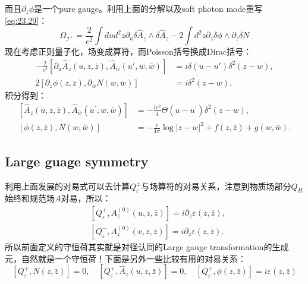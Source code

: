 而且$\partial_z \phi$是一个pure gauge。利用上面的分解以及soft photon mode重写\ref{eq:23.29}：
\begin{equation}
	\Omega_{\mathcal{I}^{+}}=\frac{2}{e^{2}}\int dud^{2}z\partial_{u}\delta\hat{A}_{z}\wedge\delta\hat{A}_{\bar{z}}-2\int d^{2}z\partial_{z}\delta\phi\wedge\partial_{\bar{z}}\delta N
\end{equation}
现在考虑正则量子化，场变成算符，而Poisson括号换成Dirac括号：
\begin{equation}
	\begin{aligned}-\frac{2}{e^2}\left[\partial_u\hat A_z(u,z,\bar z),\hat A_{\bar w}(u',w,\bar w)\right]&=i\delta(u-u')\delta^2(z-w),\\2\left[\partial_z\phi(z,\bar z),\partial_{\bar w}N(w,\bar w)\right]&=i\delta^2(z-w).\end{aligned}
\end{equation}
积分得到：
\begin{equation}
	\begin{aligned}
		\left[\hat{A}_{z}(u,z,\bar{z}),\hat{A}_{\bar{w}}(u^{\prime},w,\bar{w})\right]& =-\frac{ie^{2}}{4}\Theta(u-u^{\prime})\delta^{2}(z-w),  \\
		[\phi(z,\bar{z}),N(w,\bar{w})]& =-\frac{i}{4\pi}\log|z-w|^{2}+f(z,\bar{z})+g(w,\bar{w}). 
	\end{aligned}
\end{equation}

\subsection{Large guage symmetry}
利用上面发展的对易式可以去计算$Q_\varepsilon^{\pm}$与场算符的对易关系，注意到物质场部分$Q_H$始终和规范场$A$对易，所以：
\begin{equation}
	\begin{aligned}&\left[Q_{\varepsilon}^{+},A_{z}^{(0)}(u,z,\bar{z})\right]=i\partial_{z}\varepsilon(z,\bar{z}),\\&\left[Q_{\varepsilon}^{-},A_{z}^{(0)}(v,z,\bar{z})\right]=i\partial_{z}\varepsilon(z,\bar{z}).\end{aligned}
\end{equation}
所以前面定义的守恒荷其实就是对径认同的Large gauge transformation的生成元，自然就是一个守恒荷！下面是另外一些比较有用的对易关系：
\begin{equation}\label{eq:23.37}
	\left[Q_{\varepsilon}^{+},N(z,\bar{z})\right]=0,\quad\left[Q_{\varepsilon}^{+},\hat{A}_{z}(u,z,\bar{z})\right]=0,\quad\left[Q_{\varepsilon}^{+},\phi(z,\bar{z})\right]=i\varepsilon(z,\bar{z})
\end{equation}

